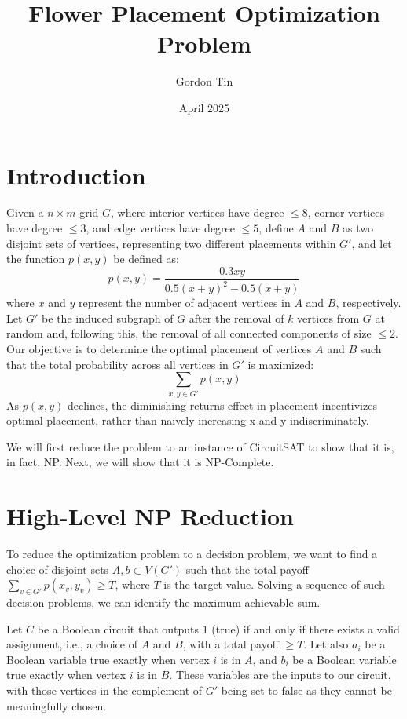 \documentclass{article}
\title{Flower Placement Optimization Problem}
\author{Gordon Tin}
\date{April 2025}
\begin{document}
\maketitle

\section{Introduction}

Given a $n \times m$ grid $G$, where interior vertices have degree $\leq 8$, corner vertices have degree $\leq 3$, and edge vertices have degree $\leq 5$, define $A$ and $B$ as two disjoint sets of vertices, representing two different placements within $G'$, and let the function $p(x,y)$ be defined as: 
\[p(x,y)= \frac{0.3xy}{0.5(x+y)^{2}-0.5(x+y)}\]
where $x$ and $y$ represent the number of adjacent vertices in $A$ and $B$, respectively. Let $G'$ be the induced subgraph of $G$ after the removal of $k$ vertices from $G$ at random and, following this, the removal of all connected components of size $\leq 2$.
Our objective is to determine the optimal placement of vertices $A$ and $B$ such that the total probability across all vertices in $G'$ is maximized: \[\sum_{x,y \in G'} p(x,y)\] 
As \(p(x,y)\) declines, the diminishing returns effect in placement incentivizes optimal placement, rather than naively increasing x and y indiscriminately.

We will first reduce the problem to an instance of CircuitSAT to show that it is, in fact, NP. Next, we will show that it is NP-Complete. 

\section{High-Level NP Reduction}

To reduce the optimization problem to a decision problem, we want to find a choice of disjoint sets $A, b \subset V(G')$ such that the total payoff $\sum_{v \in G'} p(x_v, y_v) \geq T$, where $T$ is the target value. Solving a sequence of such decision problems, we can identify the maximum achievable sum. 

Let $C$ be a Boolean circuit that outputs $1$ (true) if and only if there exists a valid assignment, i.e., a choice of $A$ and $B$, with a total payoff $\geq T$. Let also $a_i$ be a Boolean variable true exactly when vertex $i$ is in $A$, and $b_i$ be a Boolean variable true exactly when vertex $i$ is in $B$. These variables are the inputs to our circuit, with those vertices in the complement of $G'$ being set to false as they cannot be meaningfully chosen.
\end{document}
